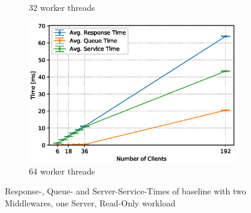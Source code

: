 \documentclass[11pt,a4paper]{article}
\begin{document}
\begin{figure}
\begin{subfigure}{.5\textwidth}
        \caption{32 worker threads}
    \end{subfigure}
    \begin{subfigure}{.5\textwidth}
        \includegraphics[width=1\linewidth]{plots/3_2a_extendedLatencyMiddleware_64w.eps}
        \caption{64 worker threads}
    \end{subfigure}

    \caption{Response-, Queue- and Server-Service-Times of baseline with two Middlewares, one Server, Read-Only workload}
    \label{fig:3-2-times-readonly}
\end{figure}
\end{document}
